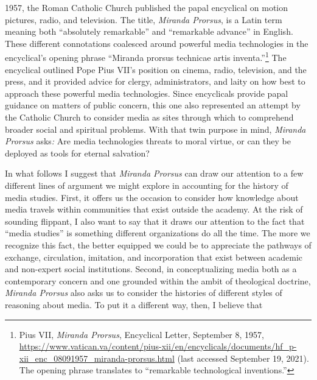 \documentclass{tufte-handout}
\begin{document}
\begin{titlepage}
 1957, the Roman Catholic Church published the papal
encyclical on motion pictures, radio, and television. The title,
\emph{Miranda Prorsus}, is a Latin term meaning both ``absolutely
remarkable'' and ``remarkable advance'' in English. These different
connotations coalesced around powerful media technologies in the
encyclical's opening phrase ``Miranda prorsus technicae artis
inventa.''\footnote{Pius VII, \emph{Miranda Prorsus}, Encyclical Letter,
  September 8, 1957,
  \url{https://www.vatican.va/content/pius-xii/en/encyclicals/documents/hf_p-xii_enc_08091957_miranda-prorsus.html}
  (last accessed September 19, 2021). The opening phrase translates to
  ``remarkable technological inventions.''} The encyclical outlined Pope
Pius VII's position on cinema, radio, television, and the press, and it
provided advice for clergy, administrators, and laity on how best to
approach these powerful media technologies. Since encyclicals provide
papal guidance on matters of public concern, this one also represented
an attempt by the Catholic Church to consider media as sites through
which to comprehend broader social and spiritual problems. With that
twin purpose in mind, \emph{Miranda Prorsus} asks\emph{:} Are media
technologies threats to moral virtue, or can they be deployed as tools
for eternal salvation?

In what follows I suggest that \emph{Miranda Prorsus} can draw our
attention to a few different lines of argument we might explore in
accounting for the history of media studies. First, it offers us the
occasion to consider how knowledge about media travels within
communities that exist outside the academy. At the risk of sounding
flippant, I also want to say that it draws our attention to the fact
that ``media studies'' is something different organizations do all the
time. The more we recognize this fact, the better equipped we could be
to appreciate the pathways of exchange, circulation, imitation, and
incorporation that exist between academic and non-expert social
institutions. Second, in conceptualizing media both as a contemporary
concern and one grounded within the ambit of theological doctrine,
\emph{Miranda Prorsus} also asks us to consider the histories of
different styles of reasoning about media. To put it a different way,
then, I believe that

\enlargethispage{2\baselineskip}

\vspace*{2em}





 \end{titlepage}
\end{document}
